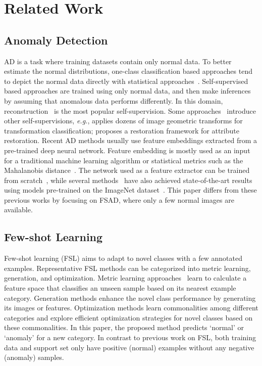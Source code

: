 \documentclass[runningheads]{llncs}
\begin{document}
\section{Related Work}
\subsection{Anomaly Detection} 
AD is a task where training datasets contain only normal data. To better estimate the normal distributions, one-class classification based approaches tend to depict the normal data directly with statistical approaches~\cite{Eskin2000Anomaly,scholkopf2001estimating,Rahmani2017Coherence,ruff2018deep}. Self-supervised based approaches are trained using only normal data, and then make inferences by assuming that anomalous data performs differently. In this domain, reconstruction~\cite{xia2015learning,schlegl2017unsupervised,zong2018deep,Sabokrou2018Adversarially,ganomaly,gong2019memorizing,metaformer,huang2022ssm} is the most popular self-supervision. Some approaches~\cite{golan2018deep,ARNet,MKD} introduce other self-supervisions, \emph{e.g.}, \cite{golan2018deep} applies dozens of image geometric transforms for transformation classification; \cite{ARNet} proposes a restoration framework for attribute restoration. Recent AD methods usually use feature embeddings extracted from a pre-trained deep neural network. Feature embedding is mostly used as an input for a traditional machine learning algorithm or statistical metrics such as the Mahalanobis distance~\cite{defard2021padim}. The network used as a feature extractor can be trained from scratch~\cite{yi2020patch}, while several methods~\cite{cutpaste,defard2021padim,focus,patchcore,cflow} have also achieved state-of-the-art results using models pre-trained on the ImageNet dataset~\cite{imagenet}. This paper differs from these previous works by focusing on FSAD, where only a few normal images are available.

\subsection{Few-shot Learning}
Few-shot learning (FSL) aims to adapt to novel classes with a few annotated examples. Representative FSL methods can be categorized into metric learning, generation, and optimization. Metric learning approaches~\cite{snell2017prototypical,sung2018learning,he2021revisiting} learn to calculate a feature space that classifies an unseen sample based on its nearest example category. Generation methods \cite{liu2020deep,yang2021free,chen2019multi} enhance the novel class performance by generating its images or features. Optimization methods \cite{Ravi2017OptimizationAA,finn2017model} learn commonalities among different categories and explore efficient optimization strategies for novel classes based on these commonalities. In this paper, the proposed method predicts `normal' or `anomaly' for a new category. In contrast to previous work on FSL, both training data and support set only have positive (normal) examples without any negative (anomaly) samples. 
\end{document}
